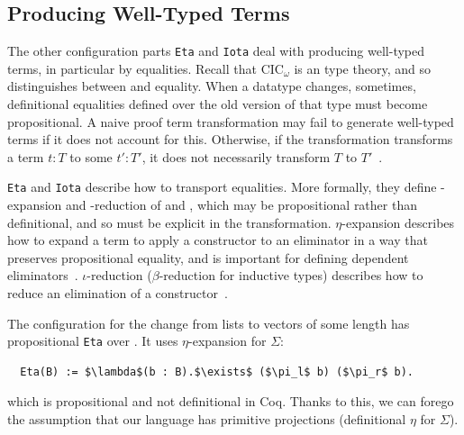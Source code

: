 \subsection{Producing Well-Typed Terms}
\label{sec:pi-diff-equal}

The other configuration parts \lstinline{Eta} and \lstinline{Iota} deal with producing well-typed terms,
in particular by  equalities.
Recall that CIC$_{\omega}$ is an  type theory,
and so distinguishes between  and  equality.
When a datatype changes, sometimes, definitional equalities defined over the old version of that type must become propositional.
A naive proof term transformation may fail to generate well-typed terms if it does not account for this.
Otherwise, if the transformation transforms a term $t : T$ to some $t' : T'$, it does not necessarily
transform $T$ to $T'$~\cite{tabareau2019marriage}.

\lstinline{Eta} and \lstinline{Iota} describe how to transport equalities.
More formally, they define \kl{$\eta$}-expansion and \kl{$\iota$}-reduction of \Aa and \B,
which may be propositional rather than definitional,
and so must be explicit in the transformation.
$\eta$-expansion describes how to expand a term to apply a constructor to an eliminator in a way that preserves propositional equality,
and is important for defining dependent eliminators~\cite{nlab:eta-conversion}.
$\iota$-reduction ($\beta$-reduction for inductive types) describes how to reduce an elimination of a constructor~\cite{nlab:beta-reduction}.

The configuration for the change from lists to vectors of some length has propositional \lstinline{Eta} over \B.
It uses $\eta$-expansion for $\Sigma$:

\begin{lstlisting}
  Eta(B) := $\lambda$(b : B).$\exists$ ($\pi_l$ b) ($\pi_r$ b).
\end{lstlisting}
which is propositional and not definitional in Coq.
Thanks to this, we can forego the assumption that our language has primitive projections (definitional $\eta$ for $\Sigma$).

